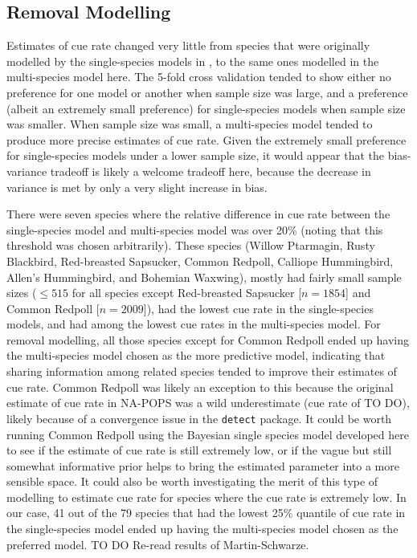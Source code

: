 \documentclass[12pt]{article}
\begin{document}
\subsection{Removal Modelling}
\par Estimates of cue rate changed very little from species that were originally modelled by the single-species models in \citet{edwards_point_2023}, to the same ones modelled in the multi-species model here.
The 5-fold cross validation tended to show either no preference for one model or another when sample size was large, and a preference (albeit an extremely small preference) for single-species models when sample size was smaller.
When sample size was small, a multi-species model tended to produce more precise estimates of cue rate.
Given the extremely small preference for single-species models under a lower sample size, it would appear that the bias-variance tradeoff is likely a welcome tradeoff here, because the decrease in variance is met by only a very slight increase in bias.

\par There were seven species where the relative difference in cue rate between the single-species model and multi-species model was over 20\% (noting that this threshold was chosen arbitrarily).
These species (Willow Ptarmagin, Rusty Blackbird, Red-breasted Sapsucker, Common Redpoll, Calliope Hummingbird, Allen's Hummingbird, and Bohemian Waxwing), mostly had fairly small sample sizes ($\leq 515$ for all species except Red-breasted Sapsucker [$n = 1854$] and Common Redpoll [$n = 2009$]), had the lowest cue rate in the single-species models, and had among the lowest cue rates in the multi-species model.
For removal modelling, all those species except for Common Redpoll ended up having the multi-species model chosen as the more predictive model, indicating that sharing information among related species tended to improve their estimates of cue rate.
Common Redpoll was likely an exception to this because the original estimate of cue rate in NA-POPS was a wild underestimate (cue rate of TO DO), likely because of a convergence issue in the \texttt{detect} package.
It could be worth running Common Redpoll using the Bayesian single species model developed here to see if the estimate of cue rate is still extremely low, or if the vague but still somewhat informative prior helps to bring the estimated parameter into a more sensible space.
It could also be worth investigating the merit of this type of modelling to estimate cue rate for species where the cue rate is extremely low.
In our case, 41 out of the 79 species that had the lowest 25\% quantile of cue rate in the single-species model ended up having the multi-species model chosen as the preferred model.
TO DO Re-read results of Martin-Schwarze.
\end{document}
